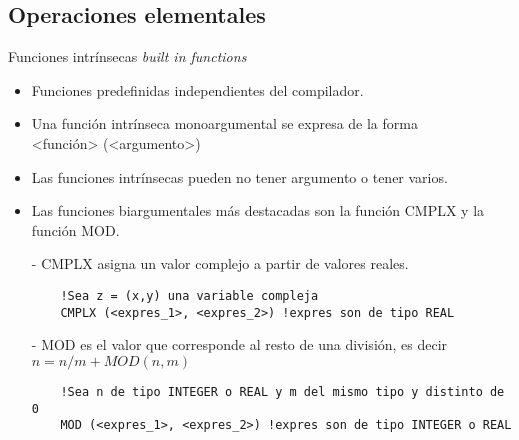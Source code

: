 
\subsection{Operaciones elementales}


\begin{frame}[fragile]{Funciones intrínsecas \textit{built in functions}}  
 \begin{itemize}[<+(0)->]
  \item Funciones predefinidas independientes del compilador. 
    \item Una función intrínseca monoargumental se expresa de la forma \\
      \centering <función> (<argumento>)\\ 
  \item Las funciones intrínsecas pueden no tener argumento o tener varios.
  \item Las funciones biargumentales más destacadas son la función CMPLX y la función MOD.
  \item [-] CMPLX asigna un valor complejo a partir de valores reales. 
   \begin{verbatim}
    !Sea z = (x,y) una variable compleja
    CMPLX (<expres_1>, <expres_2>) !expres son de tipo REAL
   \end{verbatim}
  \vspace{0.2cm}
  \item [-] MOD es el valor que corresponde al resto de una división, es decir\\
      \centering $n = n/m + MOD(n, m) $
   \begin{verbatim}
    !Sea n de tipo INTEGER o REAL y m del mismo tipo y distinto de 0
    MOD (<expres_1>, <expres_2>) !expres son de tipo INTEGER o REAL
   \end{verbatim}  
 \end{itemize}
\end{frame}

